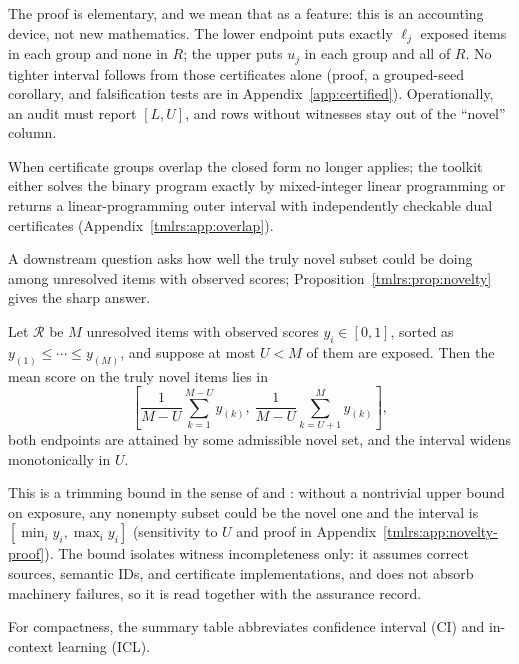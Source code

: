 \documentclass[twoside,11pt]{article}
\begin{document}
The proof is elementary, and we mean that as a feature: this is an accounting
device, not new mathematics.  The lower endpoint puts exactly $\ell_j$
exposed items in each group and none in $R$; the upper puts $u_j$ in each
group and all of $R$.  No tighter interval follows from those certificates
alone (proof, a grouped-seed corollary, and falsification tests are in
Appendix~\ref{app:certified}).  Operationally, an audit must report $[L,U]$,
and rows without witnesses stay out of the ``novel'' column.

When certificate groups overlap the closed form no longer applies; the
toolkit either solves the binary program exactly by mixed-integer linear
programming or returns a linear-programming outer interval with independently
checkable dual certificates (Appendix~\ref{tmlrs:app:overlap}).

A downstream question asks how well the truly novel subset could be doing
among unresolved items with observed scores;
Proposition~\ref{tmlrs:prop:novelty} gives the sharp answer.

\begin{proposition}
\label{tmlrs:prop:novelty}
Let $\mathcal{R}$ be $M$ unresolved items with observed scores
$y_i\in[0,1]$, sorted as
$y_{(1)}\leq\cdots\leq y_{(M)}$, and suppose at most $U<M$ of them are
exposed.  Then the mean score on the truly novel items lies in
\[
\left[
\frac{1}{M-U}\sum_{k=1}^{M-U}y_{(k)},\
\frac{1}{M-U}\sum_{k=U+1}^{M}y_{(k)}
\right],
\]
both endpoints are attained by some admissible novel set, and the interval
widens monotonically in $U$.
\end{proposition}

This is a trimming bound in the sense of \citet{lee2009training} and
\citet{horowitz1995identification}: without a nontrivial upper bound on
exposure, any nonempty subset could be the novel one and the interval is
$[\min_i y_i,\max_i y_i]$ (sensitivity to $U$ and proof in
Appendix~\ref{tmlrs:app:novelty-proof}).  The bound isolates witness
incompleteness only: it assumes correct sources, semantic IDs, and
certificate implementations, and does not absorb machinery failures, so it is
read together with the assurance record.

For compactness, the summary table abbreviates confidence interval (CI) and
in-context learning (ICL).
\end{document}
